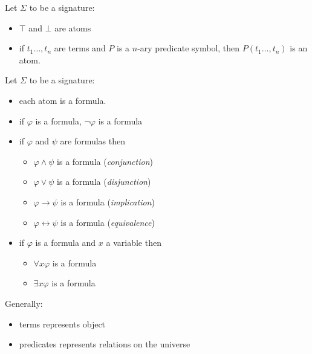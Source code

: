 \documentclass[10pt, letterpaper]{report}
\begin{document}
 \begin{definition}[Atoms]
     Let $\Sigma$ to be a signature:\begin{itemize}
        \item $\top$ and $\bot$ are atoms
        \item if $t_1\dots,t_n$ are terms and $P$ is a $n$-ary predicate symbol, then $P(t_1\dots,t_n)$ is an atom.
     \end{itemize}
 \end{definition}
 \begin{definition}[Formula]
     Let $\Sigma$ to be a signature:\begin{itemize}
        \item each atom is a formula. 
        \item if $\varphi$ is a formula, $\lnot \varphi$ is a formula 
        \item if $\varphi$ and $\psi$ are formulas then\begin{itemize}
    \item $\varphi\land \psi$ is a formula (\textit{conjunction})
    \item $\varphi\lor \psi$ is a formula (\textit{disjunction})
    \item $\varphi\rightarrow \psi$ is a formula (\textit{implication})
    \item $\varphi\leftrightarrow \psi$ is a formula (\textit{equivalence})
\end{itemize}
    \item if $\varphi$ is a formula and $x$ a variable then\begin{itemize}
        \item $\forall x\varphi$ is a formula
        \item $\exists x\varphi$ is a formula
    \end{itemize}
     \end{itemize}
 \end{definition}
 Generally:\begin{itemize}
    \item terms represents object 
    \item predicates represents relations on the universe
 \end{itemize}
\end{document}
